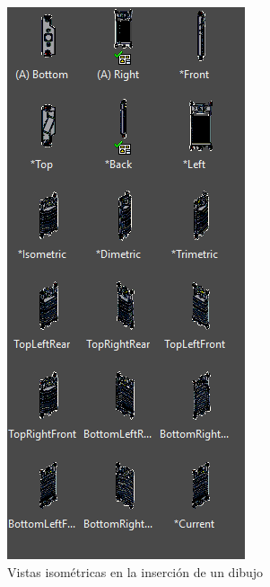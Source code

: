 \documentclass[12pt,letterpaper,final]{report}
\begin{document}
\begin{figure}[H]
	\includegraphics[width=0.95\linewidth, height=0.85\textheight,keepaspectratio]{Imagenes/solidworks_isoviews_01}
	\caption{Vistas isométricas en la inserción de un dibujo}
	\label{fig:solidworksisoviews01}
\end{figure}
\end{document}
